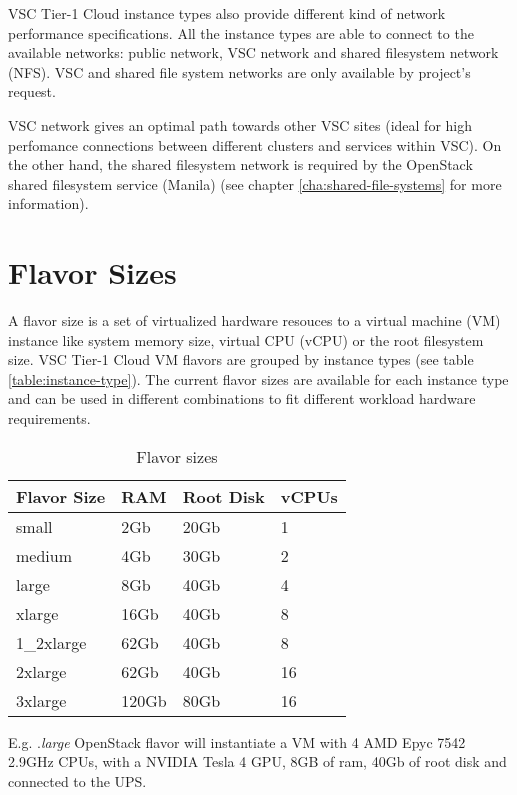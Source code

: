 VSC Tier-1 Cloud instance types also provide different kind of network
performance specifications. All the instance types are able to connect
to the available networks: public network, VSC network and shared filesystem
network (NFS). VSC and shared file system networks are only available
by project's request.

VSC network gives an optimal path towards other VSC sites (ideal for high
perfomance connections between different clusters and services within VSC).
On the other hand, the shared filesystem network is required by the OpenStack
shared filesystem service (Manila) (see chapter \ref{cha:shared-file-systems}
for more information).


\section{Flavor Sizes}\label{sec:flavor-sizes}
A flavor size is a set of virtualized hardware resouces to a virtual
machine (VM) instance like system memory size, virtual CPU (vCPU)
or the root filesystem size.
VSC Tier-1 Cloud VM flavors are grouped by instance types
(see table \ref{table:instance-type}). The current flavor sizes are
available for each instance type and can be used in different
combinations to fit different workload hardware requirements.

\begin{table}[h!]
\centering
\begin{tabular}{ |p{3cm}|p{3cm}|p{3cm}|p{3cm}| }
  \hline
  \rowcolor{lightgray} \textbf{Flavor Size} & \textbf{RAM} & \textbf{Root Disk} & \textbf{vCPUs} \\
  \hline
  small & 2Gb & 20Gb & 1 \\
  \hline
  medium & 4Gb & 30Gb & 2 \\
  \hline
  large & 8Gb & 40Gb & 4 \\
  \hline
  xlarge & 16Gb & 40Gb & 8 \\
  \hline
  1\_2xlarge & 62Gb & 40Gb & 8 \\
  \hline
  2xlarge & 62Gb & 40Gb & 16 \\
  \hline
  3xlarge & 120Gb & 80Gb & 16 \\
  \hline
\end{tabular}
\caption{Flavor sizes}
\label{table:flavor-size}
\end{table}

E.g. .\emph{large} OpenStack flavor will instantiate a
VM with 4 AMD Epyc 7542 2.9GHz CPUs, with a NVIDIA Tesla 4 GPU, 8GB
of ram, 40Gb of root disk and connected to the UPS.

